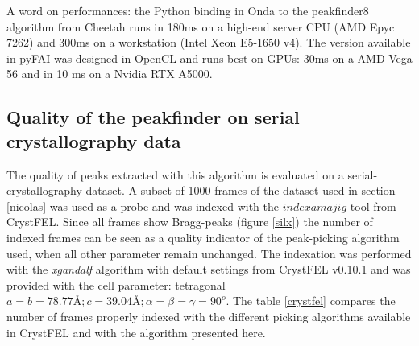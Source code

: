 \documentclass[preprint]{iucr}              %
\begin{document}
A word on performances: the Python binding in Onda to the peakfinder8 algorithm from Cheetah runs in 180ms on a high-end server CPU (AMD Epyc 7262) and 300ms on a workstation (Intel Xeon E5-1650 v4). 
The version available in pyFAI was designed in OpenCL \cite{opencl_khronos, opencl, pyopencl} and runs best on GPUs: 30ms on a AMD Vega 56 and in 10 ms on a Nvidia RTX A5000. 

\subsection{Quality of the peakfinder on serial crystallography data}
\label{quality-pf}
The quality of peaks extracted with this algorithm is evaluated on a serial-crystal\-lography dataset. 
A subset of 1000 frames of the dataset used in section \ref{nicolas}
was used as a probe and was indexed with the $indexamajig$ tool from CrystFEL. 
Since all frames show Bragg-peaks (figure \ref{silx}) the number of indexed frames can be seen as a quality indicator of the peak-picking algorithm used, when all other parameter remain unchanged.
The indexation was performed with the \textit{xgandalf} algorithm \cite{xgandalf} with default settings from CrystFEL v0.10.1 and was provided with the cell parameter: tetragonal $a=b=78.77\text{\AA}; c=39.04\text{\AA}; \alpha=\beta=\gamma = 90^o$.
The table \ref{crystfel} compares the number of frames properly indexed with the different picking algorithms available in CrystFEL and with the algorithm presented here. 
\end{document}
